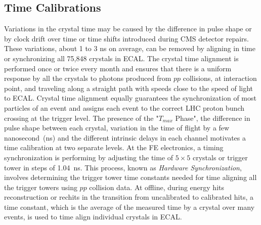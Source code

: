 \subsection{Time Calibrations}
Variations in the crystal time may be caused by the difference in pulse shape or by clock drift over time or time shifts introduced during CMS detector repairs. These variations, about 1 to 3 ns on average, can be removed by aligning in time or synchronizing all 75,848 \pb crystals in ECAL. The crystal time alignment is performed once or twice every month and ensures that there is a uniform response by all the crystals to photons produced from $pp$ collisions, at interaction point, and traveling along a straight path with speeds close to the speed of light to ECAL. Crystal time alignment equally guarantees the synchronization of most particles of an event and assigns each event to the correct LHC proton bunch crossing at the trigger level. 
\newline
The presence of the "$T_{max}$ Phase", the difference in pulse shape between each crystal, variation in the time of flight by a few nanosecond~(ns) and the different intrinsic delays in each channel motivates a time calibration at two separate levels. At the FE electronics, a timing synchronization is performing by adjusting the time of $5\times5$ crystals or trigger tower in steps of 1.04~ns. This process, known as \textit{Hardware Synchronization}, involves determining the trigger tower time constants needed for time aligning all the trigger towers using $pp$ collision data. 
\newline
At offline, during energy hits reconstruction or rechits in the transition from uncalibrated to calibrated hits, a time constant, which is the average of the measured time by a crystal over many events, is used to time align individual crystals in ECAL.


